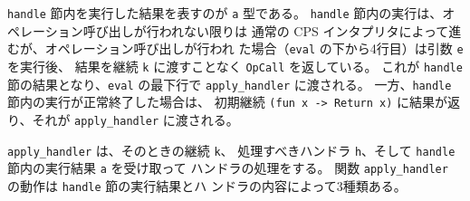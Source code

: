
\texttt{handle} 節内を実行した結果を表すのが \texttt{a} 型である。
\texttt{handle} 節内の実行は、オペレーション呼び出しが行われない限りは
通常の CPS インタプリタによって進むが、オペレーション呼び出しが行われ
た場合（\texttt{eval} の下から4行目）は引数 \texttt{e} を実行後、
結果を継続 \texttt{k} に渡すことなく \texttt{OpCall} を返している。
これが \texttt{handle} 節の結果となり、\texttt{eval} の最下行で
\texttt{apply\_handler} に渡される。
一方、\texttt{handle} 節内の実行が正常終了した場合は、
初期継続 \texttt{(fun x -> Return x)} に結果が返り、それが
\texttt{apply\_handler} に渡される。

\texttt{apply\_handler} は、そのときの継続 \texttt{k}、
処理すべきハンドラ \texttt{h}、そして
\texttt{handle} 節内の実行結果 \texttt{a} を受け取って
ハンドラの処理をする。
関数 \texttt{apply\_handler} の動作は \texttt{handle} 節の実行結果とハ
ンドラの内容によって3種類ある。



